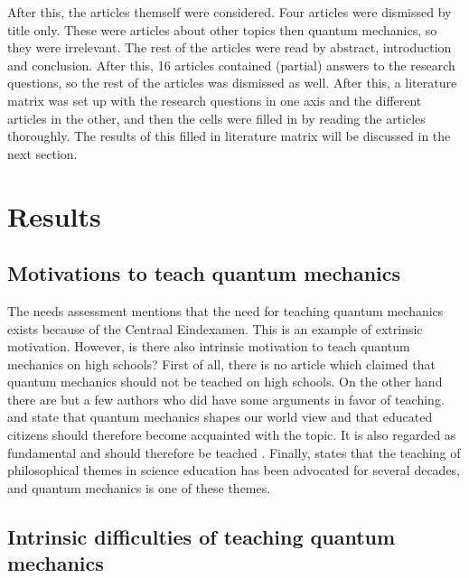 \documentclass[11pt,twoside]{report} %
\begin{document}
After this, the articles themself were considered. Four articles were dismissed by title only. These were articles about other topics then quantum mechanics, so they were irrelevant. The rest of the articles were read by abstract, introduction and conclusion. After this, 16 articles contained (partial) answers to the research questions, so the rest of the articles was dismissed as well. After this, a literature matrix was set up with the research questions in one axis and the different articles in the other, and then the cells were filled in by reading the articles thoroughly. The results of this filled in literature matrix will be discussed in the next section.

\section{Results}

\subsection{Motivations to teach quantum mechanics}

The needs assessment mentions that the need for teaching quantum mechanics exists because of the Centraal Eindexamen. This is an example of extrinsic motivation. However, is there also intrinsic motivation to teach quantum mechanics on high schools? First of all, there is no article which claimed that quantum mechanics should not be teached on high schools. On the other hand there are but a few authors who did have some arguments in favor of teaching.  and  state that quantum mechanics shapes our world view and that educated citizens should therefore become acquainted with the topic. It is also regarded as fundamental and should therefore be teached \cite{henriksen,hobson}. Finally,  states that the teaching of philosophical themes in science education has been advocated for several decades, and quantum mechanics is one of these themes.

\subsection{Intrinsic difficulties of teaching quantum mechanics}
\end{document}

